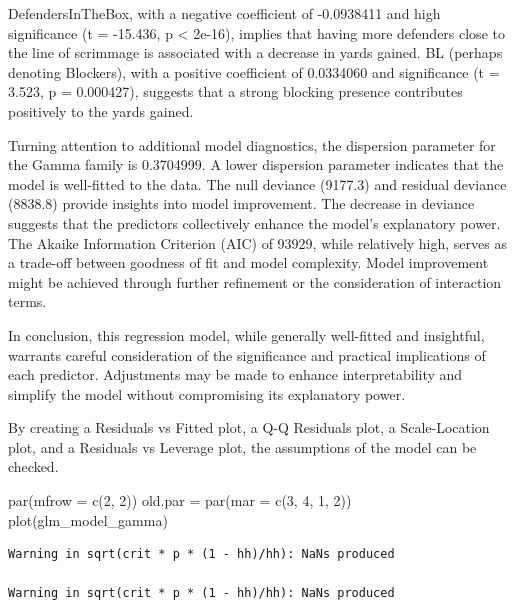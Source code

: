\documentclass[
  super,
  preprint,
  3p]{elsarticle}
\newenvironment{Shaded}{\begin{snugshade}}{\end{snugshade}}
\newcommand{\AttributeTok}[1]{\textcolor[rgb]{0.40,0.45,0.13}{#1}}
\newcommand{\DecValTok}[1]{\textcolor[rgb]{0.68,0.00,0.00}{#1}}
\newcommand{\FunctionTok}[1]{\textcolor[rgb]{0.28,0.35,0.67}{#1}}
\newcommand{\NormalTok}[1]{\textcolor[rgb]{0.00,0.23,0.31}{#1}}
\newcommand{\OtherTok}[1]{\textcolor[rgb]{0.00,0.23,0.31}{#1}}
\begin{document}
DefendersInTheBox, with a negative coefficient of -0.0938411 and high
significance (t = -15.436, p \textless{} 2e-16), implies that having
more defenders close to the line of scrimmage is associated with a
decrease in yards gained. BL (perhaps denoting Blockers), with a
positive coefficient of 0.0334060 and significance (t = 3.523, p =
0.000427), suggests that a strong blocking presence contributes
positively to the yards gained.

Turning attention to additional model diagnostics, the dispersion
parameter for the Gamma family is 0.3704999. A lower dispersion
parameter indicates that the model is well-fitted to the data. The null
deviance (9177.3) and residual deviance (8838.8) provide insights into
model improvement. The decrease in deviance suggests that the predictors
collectively enhance the model's explanatory power. The Akaike
Information Criterion (AIC) of 93929, while relatively high, serves as a
trade-off between goodness of fit and model complexity. Model
improvement might be achieved through further refinement or the
consideration of interaction terms.

In conclusion, this regression model, while generally well-fitted and
insightful, warrants careful consideration of the significance and
practical implications of each predictor. Adjustments may be made to
enhance interpretability and simplify the model without compromising its
explanatory power.

By creating a Residuals vs Fitted plot, a Q-Q Residuals plot, a
Scale-Location plot, and a Residuals vs Leverage plot, the assumptions
of the model can be checked.

\begin{Shaded}
\begin{Highlighting}[]
\FunctionTok{par}\NormalTok{(}\AttributeTok{mfrow =} \FunctionTok{c}\NormalTok{(}\DecValTok{2}\NormalTok{, }\DecValTok{2}\NormalTok{))}
\NormalTok{old.par }\OtherTok{=} \FunctionTok{par}\NormalTok{(}\AttributeTok{mar =} \FunctionTok{c}\NormalTok{(}\DecValTok{3}\NormalTok{, }\DecValTok{4}\NormalTok{, }\DecValTok{1}\NormalTok{, }\DecValTok{2}\NormalTok{))}
\FunctionTok{plot}\NormalTok{(glm\_model\_gamma)}
\end{Highlighting}
\end{Shaded}

\begin{verbatim}
Warning in sqrt(crit * p * (1 - hh)/hh): NaNs produced

Warning in sqrt(crit * p * (1 - hh)/hh): NaNs produced
\end{verbatim}
\end{document}
